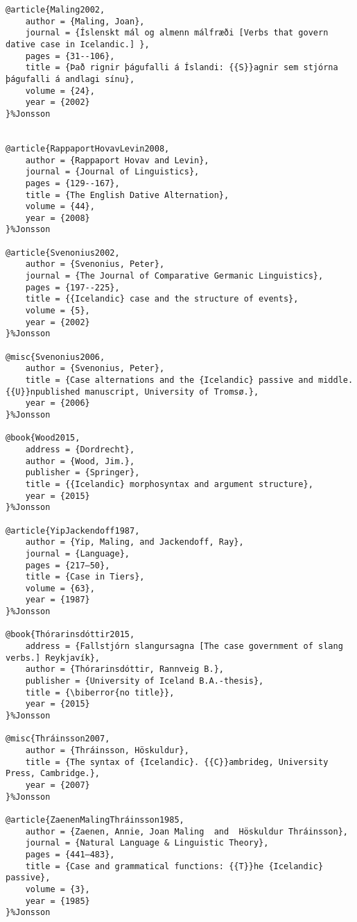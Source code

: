 \documentclass[output=paper,modfonts,nonflat]{langsci/langscibook}
\begin{document}
\begin{verbatim}
@article{Maling2002,
	author = {Maling, Joan},
	journal = {Íslenskt mál og almenn málfræði [Verbs that govern dative case in Icelandic.] },
	pages = {31--106},
	title = {Það rignir þágufalli á Íslandi: {{S}}agnir sem stjórna þágufalli á andlagi sínu},
	volume = {24},
	year = {2002}
}%Jonsson


@article{RappaportHovavLevin2008,
	author = {Rappaport Hovav and Levin},
	journal = {Journal of Linguistics},
	pages = {129--167},
	title = {The English Dative Alternation},
	volume = {44},
	year = {2008}
}%Jonsson

@article{Svenonius2002,
	author = {Svenonius, Peter},
	journal = {The Journal of Comparative Germanic Linguistics},
	pages = {197--225},
	title = {{Icelandic} case and the structure of events},
	volume = {5},
	year = {2002}
}%Jonsson

@misc{Svenonius2006,
	author = {Svenonius, Peter},
	title = {Case alternations and the {Icelandic} passive and middle. {{U}}npublished manuscript, University of Tromsø.},
	year = {2006}
}%Jonsson

@book{Wood2015,
	address = {Dordrecht},
	author = {Wood, Jim.},
	publisher = {Springer},
	title = {{Icelandic} morphosyntax and argument structure},
	year = {2015}
}%Jonsson

@article{YipJackendoff1987,
	author = {Yip, Maling, and Jackendoff, Ray},
	journal = {Language},
	pages = {217–50},
	title = {Case in Tiers},
	volume = {63},
	year = {1987}
}%Jonsson

@book{Thórarinsdóttir2015,
	address = {Fallstjórn slangursagna [The case government of slang verbs.] Reykjavík},
	author = {Thórarinsdóttir, Rannveig B.},
	publisher = {University of Iceland B.A.-thesis},
	title = {\biberror{no title}},
	year = {2015}
}%Jonsson

@misc{Thráinsson2007,
	author = {Thráinsson, Höskuldur},
	title = {The syntax of {Icelandic}. {{C}}ambrideg, University Press, Cambridge.},
	year = {2007}
}%Jonsson

@article{ZaenenMalingThráinsson1985,
	author = {Zaenen, Annie, Joan Maling  and  Höskuldur Thráinsson},
	journal = {Natural Language & Linguistic Theory},
	pages = {441–483},
	title = {Case and grammatical functions: {{T}}he {Icelandic} passive},
	volume = {3},
	year = {1985}
}%Jonsson

\end{verbatim}
\sloppy\printbibliography[heading=subbibliography,notkeyword=this]
\end{document}

